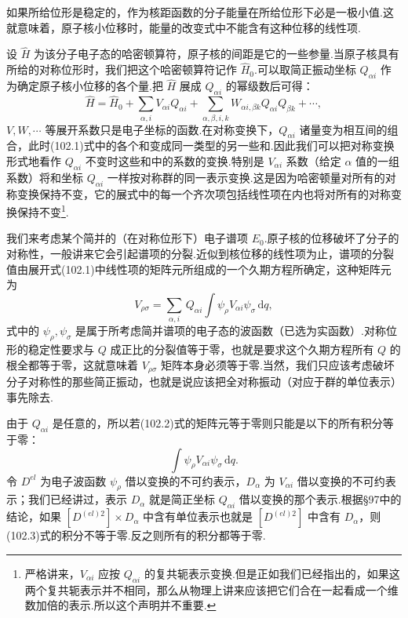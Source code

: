 如果所给位形是稳定的，作为核距函数的分子能量在所给位形下必是一极小值.这就意味着，原子核小位移时，能量的改变式中不能含有这种位移的线性项.

设 $\hat{H}$ 为该分子电子态的哈密顿算符，原子核的间距是它的一些参量.当原子核具有所给的对称位形时，我们把这个哈密顿算符记作 $\hat{H}_0$.可以取简正振动坐标 $Q_{\alpha i}$ 作为确定原子核小位移的各个量.把 $\hat{H}$ 展成 $Q_{\alpha i}$ 的幂级数后可得：
\begin{equation}
  \hat{H}=\hat{H}_0+\sum_{\alpha,i}V_{\alpha i}Q_{\alpha i}
  +\sum_{\alpha,\beta,i,k}W_{\alpha i,\beta k}Q_{\alpha i}Q_{\beta k}+\cdots,
\end{equation}
$V,W,\cdots$ 等展开系数只是电子坐标的函数.在对称变换下，$Q_{\alpha i}$ 诸量变为相互间的组合，此时(102.1)式中的各个和变成同一类型的另一些和.因此我们可以把对称变换形式地看作 $Q_{\alpha i}$ 不变时这些和中的系数的变换.特别是 $V_{\alpha i}$ 系数（给定 $\alpha$ 值的一组系数）将和坐标 $Q_{\alpha i}$ 一样按对称群的同一表示变换.这是因为哈密顿量对所有的对称变换保持不变，它的展式中的每一个齐次项包括线性项在内也将对所有的对称变换保持不变\footnote{严格讲来，$V_{\alpha i}$ 应按 $Q_{\alpha i}$ 的复共轭表示变换.但是正如我们已经指出的，如果这两个复共轭表示并不相同，那么从物理上讲来应该把它们合在一起看成一个维数加倍的表示.所以这个声明并不重要.}.

我们来考虑某个简并的（在对称位形下）电子谱项 $E_0$.原子核的位移破坏了分子的对称性，一般讲来它会引起谱项的分裂.近似到核位移的线性项为止，谱项的分裂值由展开式(102.1)中线性项的矩阵元所组成的一个久期方程所确定，这种矩阵元为
\begin{equation}
  V_{\rho\sigma}=\sum_{\alpha,i}\,Q_{\alpha i}\int\psi_\rho V_{\alpha i}\psi_\sigma\,\mathrm{d}q,
\end{equation}
式中的 $\psi_\rho,\psi_\sigma$ 是属于所考虑简并谱项的电子态的波函数（已选为实函数）.对称位形的稳定性要求与 $Q$ 成正比的分裂值等于零，也就是要求这个久期方程所有 $Q$ 的根全都等于零，这就意味着 $V_{\rho\sigma}$ 矩阵本身必须等于零.当然，我们只应该考虑破坏分子对称性的那些简正振动，也就是说应该把全对称振动（对应于群的单位表示）事先除去.

由于 $Q_{\alpha i}$ 是任意的，所以若(102.2)式的矩阵元等于零则只能是以下的所有积分等于零：
\begin{equation}
  \int\psi_\rho V_{\alpha i}\psi_\sigma\,\mathrm{d}q.
\end{equation}
令 $D^{el}$ 为电子波函数 $\psi_\rho$ 借以变换的不可约表示，$D_\alpha$ 为 $V_{\alpha i}$ 借以变换的不可约表示；我们已经讲过，表示 $D_\alpha$ 就是简正坐标 $Q_{\alpha i}$ 借以变换的那个表示.根据§97中的结论，如果 $[D^{(el)2}]\times D_\alpha$ 中含有单位表示也就是 $[D^{(el)2}]$ 中含有 $D_\alpha$，则(102.3)式的积分不等于零.反之则所有的积分都等于零.

